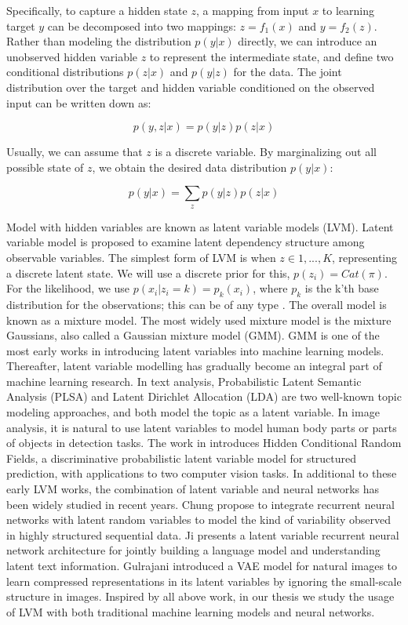 Specifically, to capture a hidden state $z$, a mapping from input $x$ to learning target $y$ can be decomposed into two mappings: $z=f_1(x)$ and $y=f_2(z)$. Rather than modeling the distribution $p(y|x)$ directly, we can introduce an unobserved hidden variable $z$ to represent the intermediate state, and define two conditional distributions $p(z|x)$ and $p(y|z)$ for the data. The joint distribution over the target and hidden variable conditioned on the observed input can be written down as:

\[p(y,z|x) = p(y|z)p(z|x)\]

Usually, we can assume that $z$ is a discrete variable. By marginalizing out all possible state of $z$, we obtain the desired data distribution $p(y|x)$:

\[p(y|x) = \sum_z p(y|z)p(z|x)\] \label{eq2}

Model with hidden variables are known as latent variable models (LVM). Latent variable model is proposed to examine latent dependency structure among observable variables. The simplest form of LVM is when $z\in{1,...,K}$, representing a discrete latent state. We will use a discrete prior for this, $p(z_i)=Cat(\pi)$. For the likelihood, we use $p(x_i|z_i=k)=p_k(x_i)$, where $p_k$ is the k'th base distribution for the observations; this can be of any type \cite{murphy2012machine}. The overall model is known as a mixture model. The most widely used mixture model is the mixture Gaussians, also called a Gaussian mixture model (GMM). GMM is one of the most early works in introducing latent variables into machine learning models. Thereafter, latent variable modelling has gradually become an integral part of machine learning research. In text analysis, Probabilistic Latent Semantic Analysis (PLSA) \cite{hofmann2013probabilistic2} and Latent Dirichlet Allocation (LDA) \cite{blei2003latent} are two well-known topic modeling approaches, and both model the topic as a latent variable. In image analysis, it is natural to use latent variables to model human body parts or parts of objects in detection tasks. The work in \cite{wang2006hidden} introduces Hidden Conditional Random Fields, a discriminative probabilistic latent variable model for structured prediction, with applications to two computer vision tasks. In additional to these early LVM works, the combination of latent variable and neural networks has been widely studied in recent years. Chung \cite{chung2015recurrent} propose to integrate recurrent neural networks with latent random variables to model the kind of variability observed in highly structured sequential data. Ji \cite{ji2016latent2} presents a latent variable recurrent neural network architecture for jointly building a language model and understanding latent text information. Gulrajani \cite{gulrajani2016pixelvae2} introduced a VAE model for natural images to learn compressed representations in its latent variables by ignoring the small-scale structure in images. Inspired by all above work, in our thesis we study the usage of LVM with both traditional machine learning models and neural networks.

